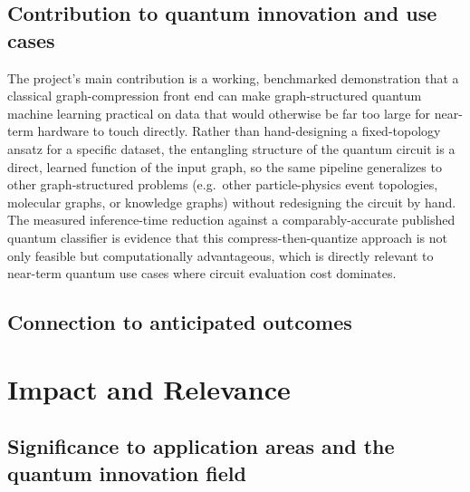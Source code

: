 \documentclass[11pt]{article}
\begin{document}

\subsection*{Contribution to quantum innovation and use cases}

The project's main contribution is a working, benchmarked demonstration that
a classical graph-compression front end can make graph-structured quantum
machine learning practical on data that would otherwise be far too large for
near-term hardware to touch directly. Rather than hand-designing a
fixed-topology ansatz for a specific dataset, the entangling structure of
the quantum circuit is a direct, learned function of the input graph, so the
same pipeline generalizes to other graph-structured problems (e.g.\ other
particle-physics event topologies, molecular graphs, or knowledge graphs)
without redesigning the circuit by hand. The measured inference-time
reduction against a comparably-accurate published quantum classifier is
evidence that this compress-then-quantize approach is not only feasible but
computationally advantageous, which is directly relevant to near-term
quantum use cases where circuit evaluation cost dominates.

\subsection*{Connection to anticipated outcomes}


\section*{Impact and Relevance}

\subsection*{Significance to application areas and the quantum innovation field}
\end{document}
